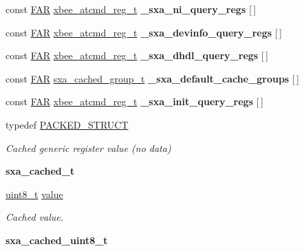 \begin{DoxyCompactItemize}
\item 
const \hyperlink{group__hal_gaef060b3456fdcc093a7210a762d5f2ed}{F\-A\-R} \hyperlink{structxbee__atcmd__reg__t}{xbee\-\_\-atcmd\-\_\-reg\-\_\-t} {\bfseries \-\_\-sxa\-\_\-ni\-\_\-query\-\_\-regs} \mbox{[}$\,$\mbox{]}
\item 
const \hyperlink{group__hal_gaef060b3456fdcc093a7210a762d5f2ed}{F\-A\-R} \hyperlink{structxbee__atcmd__reg__t}{xbee\-\_\-atcmd\-\_\-reg\-\_\-t} {\bfseries \-\_\-sxa\-\_\-devinfo\-\_\-query\-\_\-regs} \mbox{[}$\,$\mbox{]}
\item 
const \hyperlink{group__hal_gaef060b3456fdcc093a7210a762d5f2ed}{F\-A\-R} \hyperlink{structxbee__atcmd__reg__t}{xbee\-\_\-atcmd\-\_\-reg\-\_\-t} {\bfseries \-\_\-sxa\-\_\-dhdl\-\_\-query\-\_\-regs} \mbox{[}$\,$\mbox{]}
\item 
const \hyperlink{group__hal_gaef060b3456fdcc093a7210a762d5f2ed}{F\-A\-R} \hyperlink{structsxa__cached__group__t}{sxa\-\_\-cached\-\_\-group\-\_\-t} {\bfseries \-\_\-sxa\-\_\-default\-\_\-cache\-\_\-groups} \mbox{[}$\,$\mbox{]}
\item 
const \hyperlink{group__hal_gaef060b3456fdcc093a7210a762d5f2ed}{F\-A\-R} \hyperlink{structxbee__atcmd__reg__t}{xbee\-\_\-atcmd\-\_\-reg\-\_\-t} {\bfseries \-\_\-sxa\-\_\-init\-\_\-query\-\_\-regs} \mbox{[}$\,$\mbox{]}
\item 
typedef \hyperlink{group___s_x_a_ga4233297bd31be5c273d4fb0758cc54d7}{P\-A\-C\-K\-E\-D\-\_\-\-S\-T\-R\-U\-C\-T}
\begin{DoxyCompactList}\small\item\em Cached generic register value (no data) \end{DoxyCompactList}\item 
\hypertarget{group___s_x_a_ga96e5f9309b5a697a88199927d4ababa3}{{\bfseries sxa\-\_\-cached\-\_\-t}}\label{group___s_x_a_ga96e5f9309b5a697a88199927d4ababa3}

\item 
\hypertarget{group___s_x_a_ga810fe9819dfe66daa9ce4981812b46c3}{\hyperlink{group__hal_gae1affc9ca37cfb624959c866a73f83c2}{uint8\-\_\-t} \hyperlink{group___s_x_a_ga810fe9819dfe66daa9ce4981812b46c3}{value}}\label{group___s_x_a_ga810fe9819dfe66daa9ce4981812b46c3}

\begin{DoxyCompactList}\small\item\em Cached value. \end{DoxyCompactList}\item 
\hypertarget{group___s_x_a_gac74fc48f2d0a7772b891264671bff3db}{{\bfseries sxa\-\_\-cached\-\_\-uint8\-\_\-t}}\label{group___s_x_a_gac74fc48f2d0a7772b891264671bff3db}


\end{DoxyCompactItemize}
